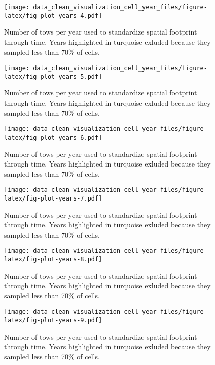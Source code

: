 \documentclass[
]{article}
\begin{document}
\begin{figure}
\centering
\texttt{[image: data\_clean\_visualization\_cell\_year\_files/figure-latex/fig-plot-years-4.pdf]}
\caption{\label{fig:fig-plot-years-4}Number of tows per year used to standardize spatial footprint through time. Years highlighted in turquoise exluded because they sampled less than 70\% of cells.}
\end{figure}

\begin{figure}
\centering
\texttt{[image: data\_clean\_visualization\_cell\_year\_files/figure-latex/fig-plot-years-5.pdf]}
\caption{\label{fig:fig-plot-years-5}Number of tows per year used to standardize spatial footprint through time. Years highlighted in turquoise exluded because they sampled less than 70\% of cells.}
\end{figure}

\begin{figure}
\centering
\texttt{[image: data\_clean\_visualization\_cell\_year\_files/figure-latex/fig-plot-years-6.pdf]}
\caption{\label{fig:fig-plot-years-6}Number of tows per year used to standardize spatial footprint through time. Years highlighted in turquoise exluded because they sampled less than 70\% of cells.}
\end{figure}

\begin{figure}
\centering
\texttt{[image: data\_clean\_visualization\_cell\_year\_files/figure-latex/fig-plot-years-7.pdf]}
\caption{\label{fig:fig-plot-years-7}Number of tows per year used to standardize spatial footprint through time. Years highlighted in turquoise exluded because they sampled less than 70\% of cells.}
\end{figure}

\begin{figure}
\centering
\texttt{[image: data\_clean\_visualization\_cell\_year\_files/figure-latex/fig-plot-years-8.pdf]}
\caption{\label{fig:fig-plot-years-8}Number of tows per year used to standardize spatial footprint through time. Years highlighted in turquoise exluded because they sampled less than 70\% of cells.}
\end{figure}

\begin{figure}
\centering
\texttt{[image: data\_clean\_visualization\_cell\_year\_files/figure-latex/fig-plot-years-9.pdf]}
\caption{\label{fig:fig-plot-years-9}Number of tows per year used to standardize spatial footprint through time. Years highlighted in turquoise exluded because they sampled less than 70\% of cells.}
\end{figure}
\end{document}
